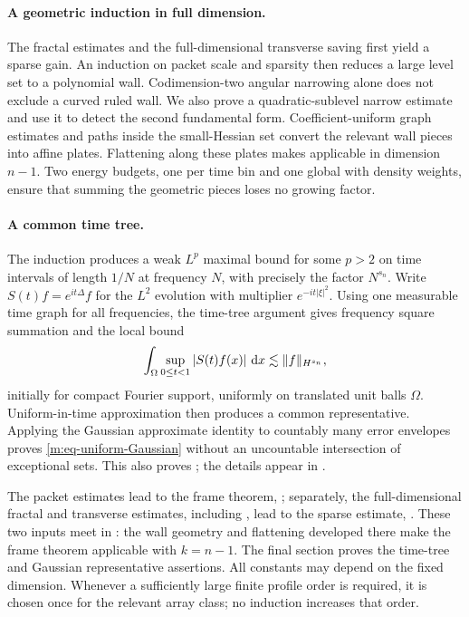 \paragraph{A geometric induction in full dimension.}
The fractal estimates and the full-dimensional transverse saving first
yield a sparse gain.  An induction on
packet scale and sparsity then reduces a large level set to a
polynomial wall.  Codimension-two angular narrowing alone does not
exclude a curved ruled wall.  We also prove a quadratic-sublevel
narrow estimate and use it to detect the second fundamental form.
Coefficient-uniform graph estimates and paths inside the small-Hessian
set convert the relevant wall pieces into affine plates.  Flattening
along these plates makes  applicable in dimension $n-1$.
Two energy budgets, one per time bin and one global with density
weights, ensure that summing the geometric pieces loses no growing
factor.

\paragraph{A common time tree.}
The induction produces a weak $L^p$ maximal bound for some $p>2$ on
time intervals of length $1/N$ at frequency $N$, with precisely the
factor $N^{s_n}$.  Write $S(t)f=e^{it\Delta}f$ for the $L^2$ evolution
with multiplier $e^{-it|\xi|^2}$.  Using one measurable time graph for all frequencies,
the time-tree argument gives frequency square summation and the local
bound
\begin{equation}\label{m:eq-roadmap-maximal}
 \int_\Omega\sup_{0\leq t<1}|S(t)f(x)|\,\,\mathrm d x
 \lesssim\lVert f\rVert_{H^{s_n}},
\end{equation}
initially for compact Fourier support, uniformly on translated unit
balls $\Omega$.  Uniform-in-time approximation then produces a common
representative.  Applying the Gaussian approximate identity to
countably many error envelopes proves
\eqref{m:eq-uniform-Gaussian} without an uncountable intersection of
exceptional sets.  This also proves ; the details appear
in .

The packet estimates lead to the frame theorem, ;
separately, the full-dimensional fractal and transverse estimates,
including , lead to the sparse estimate,
.  These two inputs meet in : the wall
geometry and flattening developed there make the frame theorem
applicable with $k=n-1$.  The final section proves the time-tree and
Gaussian representative assertions.  All constants may depend on the fixed
dimension.  Whenever a sufficiently large finite profile order is
required, it is chosen once for the relevant array class; no induction
increases that order.
